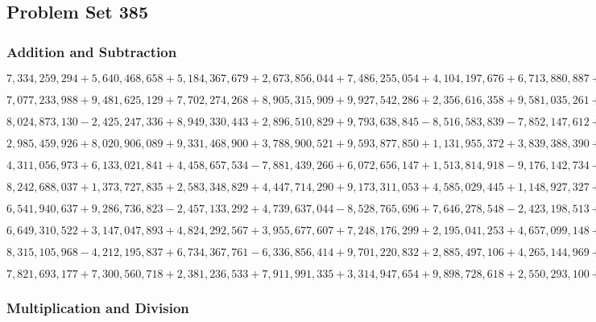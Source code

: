 \hypertarget{problem-set-385}{%
\subsection{Problem Set 385}\label{problem-set-385}}

\hypertarget{addition-and-subtraction}{%
\subsubsection{Addition and
Subtraction}\label{addition-and-subtraction}}

\(7,334,259,294+5,640,468,658+5,184,367,679+2,673,856,044+7,486,255,054+4,104,197,676+6,713,880,887+3,662,713,367+9,316,869,722+3,244,191,946\)

\(7,077,233,988+9,481,625,129+7,702,274,268+8,905,315,909+9,927,542,286+2,356,616,358+9,581,035,261+1,990,786,433+2,678,912,190+9,818,542,503\)

\(8,024,873,130-2,425,247,336+8,949,330,443+2,896,510,829+9,793,638,845-8,516,583,839-7,852,147,612+9,730,481,759+1,360,205,400-3,917,453,134\)

\(2,985,459,926+8,020,906,089+9,331,468,900+3,788,900,521+9,593,877,850+1,131,955,372+3,839,388,390+2,174,455,892+6,283,171,002+2,449,221,366\)

\(4,311,056,973+6,133,021,841+4,458,657,534-7,881,439,266+6,072,656,147+1,513,814,918-9,176,142,734-3,653,022,884+8,075,579,545-6,915,958,006\)

\(8,242,688,037+1,373,727,835+2,583,348,829+4,447,714,290+9,173,311,053+4,585,029,445+1,148,927,327+5,489,235,829+8,716,781,220+3,603,555,954\)

\(6,541,940,637+9,286,736,823-2,457,133,292+4,739,637,044-8,528,765,696+7,646,278,548-2,423,198,513+6,951,274,450-9,186,145,677+2,584,971,607\)

\(6,649,310,522+3,147,047,893+4,824,292,567+3,955,677,607+7,248,176,299+2,195,041,253+4,657,099,148+1,747,217,220+6,104,626,210+3,826,176,378\)

\(8,315,105,968-4,212,195,837+6,734,367,761-6,336,856,414+9,701,220,832+2,885,497,106+4,265,144,969+3,707,768,744-7,384,745,352-1,741,990,976\)

\(7,821,693,177+7,300,560,718+2,381,236,533+7,911,991,335+3,314,947,654+9,898,728,618+2,550,293,100+5,034,438,894+8,357,772,642+2,391,068,419\)

\hypertarget{multiplication-and-division}{%
\subsubsection{Multiplication and
Division}\label{multiplication-and-division}}

